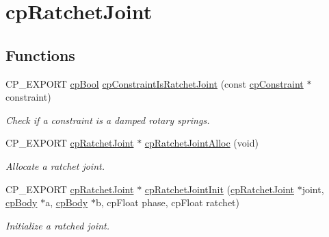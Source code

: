 \hypertarget{group__cpRatchetJoint}{}\section{cp\+Ratchet\+Joint}
\label{group__cpRatchetJoint}
\subsection*{Functions}
\begin{DoxyCompactItemize}
\item 
\mbox{\label{group__cpRatchetJoint_ga76d6a70c756ccd05d081a7a7c0c058e7}} 
C\+P\+\_\+\+E\+X\+P\+O\+RT \hyperlink{group__basicTypes_gabc5e752c48f3449ca26ef413ecbd647e}{cp\+Bool} \hyperlink{group__cpRatchetJoint_ga76d6a70c756ccd05d081a7a7c0c058e7}{cp\+Constraint\+Is\+Ratchet\+Joint} (const \hyperlink{structcpConstraint}{cp\+Constraint} $\ast$constraint)
\begin{DoxyCompactList}\small\item\em Check if a constraint is a damped rotary springs. \end{DoxyCompactList}\item 
\mbox{\label{group__cpRatchetJoint_ga42a10c2a14057dc4fadc408878add404}} 
C\+P\+\_\+\+E\+X\+P\+O\+RT \hyperlink{structcpRatchetJoint}{cp\+Ratchet\+Joint} $\ast$ \hyperlink{group__cpRatchetJoint_ga42a10c2a14057dc4fadc408878add404}{cp\+Ratchet\+Joint\+Alloc} (void)
\begin{DoxyCompactList}\small\item\em Allocate a ratchet joint. \end{DoxyCompactList}\item 
\mbox{\label{group__cpRatchetJoint_ga6d3d379b8ea00d409c37ca68df12f0b7}} 
C\+P\+\_\+\+E\+X\+P\+O\+RT \hyperlink{structcpRatchetJoint}{cp\+Ratchet\+Joint} $\ast$ \hyperlink{group__cpRatchetJoint_ga6d3d379b8ea00d409c37ca68df12f0b7}{cp\+Ratchet\+Joint\+Init} (\hyperlink{structcpRatchetJoint}{cp\+Ratchet\+Joint} $\ast$joint, \hyperlink{structcpBody}{cp\+Body} $\ast$a, \hyperlink{structcpBody}{cp\+Body} $\ast$b, cp\+Float phase, cp\+Float ratchet)
\begin{DoxyCompactList}\small\item\em Initialize a ratched joint. \end{DoxyCompactList}\item 

\end{DoxyCompactItemize}
